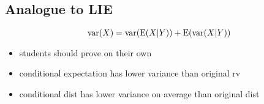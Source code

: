 \subsection{Analogue to LIE}
\[\operatorname{var}(X) = \operatorname{var}(\operatorname{E}(X|Y)) + \operatorname{E}(\operatorname{var}(X|Y))\]
\begin{itemize}
\item students should prove on their own
\item conditional expectation has lower variance than original rv
\item conditional dist has lower variance on average than original
         dist
\end{itemize}

